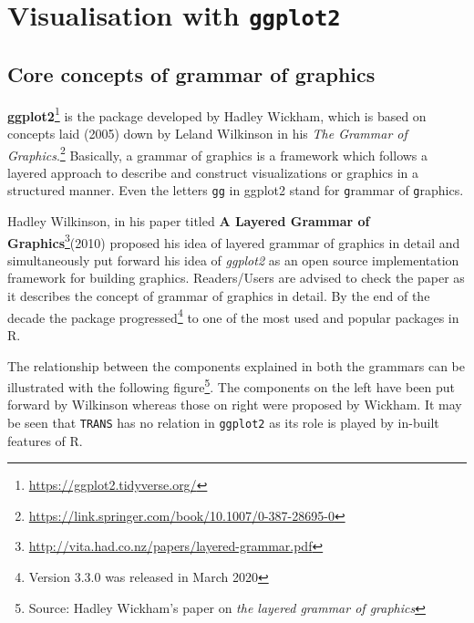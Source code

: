 \documentclass[
]{book}
\begin{document}
\hypertarget{visualisation-with-ggplot2}{%
\chapter{\texorpdfstring{Visualisation with \texttt{ggplot2}}{Visualisation with ggplot2}}\label{visualisation-with-ggplot2}}

\hypertarget{core-concepts-of-grammar-of-graphics}{%
\section{\texorpdfstring{Core concepts of \textbf{grammar of graphics}}{Core concepts of grammar of graphics}}\label{core-concepts-of-grammar-of-graphics}}

\textbf{ggplot2}\footnote{\url{https://ggplot2.tidyverse.org/}} \citep{R-ggplot2} is the package developed by Hadley Wickham, which is based on concepts laid (2005) down by Leland Wilkinson in his \emph{The Grammar of Graphics}.\footnote{\url{https://link.springer.com/book/10.1007/0-387-28695-0}} Basically, a grammar of graphics is a framework which follows a layered approach to describe and construct visualizations or graphics in a structured manner. Even the letters \texttt{gg} in ggplot2 stand for \texttt{g}rammar of \texttt{g}raphics.

Hadley Wilkinson, in his paper titled \textbf{A Layered Grammar of Graphics}\footnote{\url{http://vita.had.co.nz/papers/layered-grammar.pdf}}(2010) \citep{layered-grammar} proposed his idea of layered grammar of graphics in detail and simultaneously put forward his idea of \emph{ggplot2} as an open source implementation framework for building graphics. Readers/Users are advised to check the paper as it describes the concept of grammar of graphics in detail. By the end of the decade the package progressed\footnote{Version 3.3.0 was released in March 2020} to one of the most used and popular packages in R.

The relationship between the components explained in both the grammars can be illustrated with the following figure\footnote{Source: Hadley Wickham's paper on \emph{the layered grammar of graphics}}. The components on the left have been put forward by Wilkinson whereas those on right were proposed by Wickham. It may be seen that \texttt{TRANS} has no relation in \texttt{ggplot2} as its role is played by in-built features of R.
\end{document}
